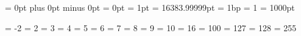 
\def\newhelp#1#2{\newtoks#1#1\expandafter{\csname#2\endcsname}}


\newcount   \scratchcounter   \newcount  \globalscratchcounter
\newdimen   \scratchdimen     \newdimen  \globalscratchdimen
\newskip    \scratchskip      \newskip   \globalscratchskip
\newmuskip  \scratchmuskip    \newmuskip \globalscratchmuskip
\newtoks    \scratchtoks      \newtoks   \globalscratchtoks
\newbox     \scratchbox       \newbox    \globalscratchbox

\newcount\scratchcounterone  \newcount\scratchcountertwo  \newcount\scratchcounterthree
\newdimen  \scratchdimenone  \newdimen  \scratchdimentwo  \newdimen  \scratchdimenthree
\newdimen   \scratchskipone  \newdimen   \scratchskiptwo  \newdimen   \scratchskipthree
\newbox   \scratchmuskipone  \newbox   \scratchmuskiptwo  \newbox   \scratchmuskipthree
\newtoks    \scratchtoksone  \newtoks    \scratchtokstwo  \newtoks    \scratchtoksthree
\newbox      \scratchboxone  \newbox      \scratchboxtwo  \newbox      \scratchboxthree


\newskip \zeroskip     \zeroskip     = 0pt plus 0pt minus 0pt
\newdimen\zeropoint    \zeropoint    = 0pt
\newdimen\onepoint     \onepoint     = 1pt
\newdimen\maxdimen     \maxdimen     = 16383.99999pt
\newdimen\onebasepoint \onebasepoint = 1bp
\chardef \scaledpoint                = 1
\newdimen\thousandpoint\thousandpoint= 1000pt

\let\points\onepoint

\newtoks \emptytoks


\newcount   \minustwo \minustwo =    -2
\chardef    \plustwo            =     2
\chardef    \plusthree          =     3
\chardef    \plusfour           =     4
\chardef    \plusfive           =     5
\chardef    \plussix            =     6
\chardef    \plusseven          =     7
\chardef    \pluseight          =     8
\chardef    \plusnine           =     9
\chardef    \plusten            =    10
\chardef    \plussixteen        =    16
\chardef    \plushundred        =   100
\chardef    \pluscxxvii         =   127
\chardef    \pluscxxviii        =   128
\chardef    \pluscclv           =   255


